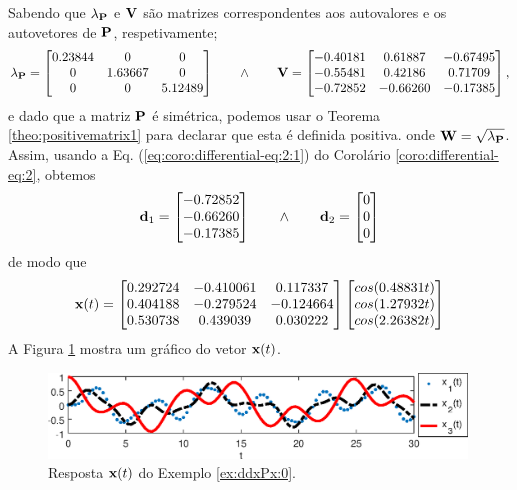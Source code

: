 \newpage
\begin{SolutionT}
\label{ex:ddxPx:0:sol1}
Sabendo que $\lambda_{\MATRIX{P}}$ e $\MATRIX{V}$ são matrizes correspondentes aos autovalores e os autovetores de $\MATRIX{P}$,
respetivamente; 
\begin{equation}
\lambda_{\MATRIX{P}}=
\begin{bmatrix}
   0.23844 &       0 &       0\\
         0 & 1.63667 &       0\\
         0 &       0 & 5.12489
\end{bmatrix}
\qquad \wedge \qquad
\MATRIX{V}=
\begin{bmatrix}
  -0.40181 & 0.61887 &-0.67495\\
  -0.55481 & 0.42186 & 0.71709\\
  -0.72852 &-0.66260 &-0.17385
\end{bmatrix},
\end{equation}
e dado que a matriz $\MATRIX{P}$ é simétrica, podemos usar o Teorema \ref{theo:positivematrix1}
para declarar que esta é definida positiva. 
onde $\MATRIX{W}=\sqrt{\lambda_{\MATRIX{P}}}$.
Assim, usando a Eq. (\ref{eq:coro:differential-eq:2:1}) do Corolário \ref{coro:differential-eq:2},
obtemos
\begin{equation}
\VECTOR{d}_1=
\begin{bmatrix}
  -0.72852\\
  -0.66260\\
  -0.17385
\end{bmatrix}
\qquad \wedge \qquad
\VECTOR{d}_2=
\begin{bmatrix}
   0\\
   0\\
   0
\end{bmatrix}
\end{equation}
de modo que 
\begin{equation}
 \VECTOR{x}(t)= 
\begin{bmatrix}
   0.292724 &-0.410061 & 0.117337\\
   0.404188 &-0.279524 &-0.124664\\
   0.530738 & 0.439039 & 0.030222
\end{bmatrix}
\begin{bmatrix}
   cos(0.48831 t)\\
   cos(1.27932 t)\\
   cos(2.26382 t)
\end{bmatrix}
\end{equation}
A Figura \ref{fig:ex:ddxPx:0} mostra um gráfico do vetor $\VECTOR{x}(t)$.
\end{SolutionT}
     \begin{figure}[!h]
         \centering
         \includegraphics[width=0.99\textwidth]{chapters/differential-eq/mfiles/segundoorder/segundoroder1.eps}
         \caption{Resposta $\VECTOR{x}(t)$ do Exemplo \ref{ex:ddxPx:0}.}
         \label{fig:ex:ddxPx:0}
     \end{figure}

